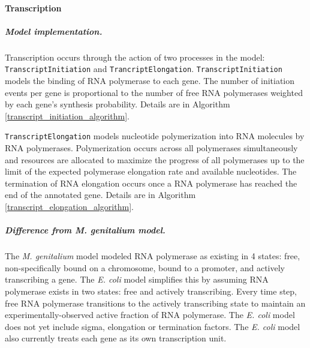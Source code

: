 \documentclass[12pt]{article}
\begin{document}
\baselineskip24pt

\paragraph{Transcription}

\subparagraph{Model implementation.}
Transcription occurs through the action of two processes in the model: \texttt{TranscriptInitiation} and \texttt{TrancriptElongation}. \texttt{TranscriptInitiation} models the binding of RNA polymerase  to each gene. The number of initiation events per gene is proportional to the number of free RNA polymerases weighted by each gene's synthesis probability. Details are in Algorithm \ref{transcript_initiation_algorithm}.

\texttt{TranscriptElongation} models nucleotide polymerization into RNA molecules by RNA polymerases. Polymerization occurs across all polymerases simultaneously and resources are allocated to maximize the progress of all polymerases up to the limit of the expected polymerase elongation rate and available nucleotides. The termination of RNA elongation occurs once a RNA polymerase has reached the end of the annotated gene. Details are in Algorithm \ref{transcript_elongation_algorithm}.


\subparagraph{Difference from \emph{M. genitalium} model.}
The \emph{M. genitalium} model modeled RNA polymerase as existing in 4 states: free, non-specifically bound on a chromosome, bound to a promoter, and actively transcribing a gene. The \emph{E. coli} model simplifies this by assuming RNA polymerase exists in two states: free and actively transcribing. Every time step, free RNA polymerase transitions to the actively transcribing state to maintain an experimentally-observed active fraction of RNA polymerase. The \emph{E. coli} model does not yet include sigma, elongation or termination factors. The \textit{E. coli} model also currently treats each gene as its own transcription unit.\\
\end{document}
